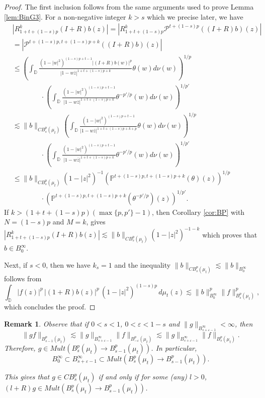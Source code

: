\documentclass[12pt,twoside,leqno,final]{amsart}
\theoremstyle{plain}
\newtheorem{rem}[thm]{Remark}
\begin{document}
\begin{proof}
The first inclusion  follows from the same arguments used to prove Lemma \ref{lem:BinG3}. 
For a non-negative integer $k>s$ which we precise later, we have 
\begin{align*}
&|R_{1+t+(1-s)p}^{k}(I+R) b(z)|=|R_{1+t+(1-s)p}^{k}{{\mathcal P}}^{t+(1-s)p}((I+R)b)(z)|\\
&=|{{\mathcal P}}^{t+(1-s)p,t+(1-s)p+k}((I+R) b)(z)|\\
&\le \left(\int_{{\mathbb D}} \frac{(1-|w|^2)^{(1-s)p+t-1}|(I+R)b(w)|^p}
{|1-w\overline z|^{1+t+(1-s)p+k}}\theta(w)d\nu(w)\right)^{1/p}\,\\
&\qquad\qquad \cdot\left( \int_{{\mathbb D}}\frac{(1-|w|^2)^{(1-s)p+t-1}}{|1-w\overline z|^{1+t+(1-s)p+k}}\theta^{-p'/p}(w)d\nu(w)\right)^{1/p'}\\
&\lesssim \|b\|_{CB^p_s(\mu_t)}\left(\int_{{\mathbb D}} \frac{(1-|w|^2)^{(1-s)p+t-1}}
{|1-w\overline z|^{1+t+(1-s)p+k+p}}\theta(w)d\nu(w)\right)^{1/p}\,\\
&\qquad\qquad \cdot\left( \int_{{\mathbb D}}\frac{(1-|w|^2)^{(1-s)p+t-1}}{|1-w\overline z|^{1+t+(1-s)p+k}}\theta^{-p'/p}(w)d\nu(w)\right)^{1/p'}\\
&\le \|b\|_{CB^p_s(\mu_t)}
(1-|z|^2)^{-1}\left({\mathbb{P}}^{t+(1-s)p,t+(1-s)p+k}(\theta)(z)\right)^{1/p}\,\\
&\qquad\qquad\cdot\left({\mathbb{P}}^{t+(1-s)p,t+(1-s)p+k}(\theta^{-p'/p})(z)\right)^{1/p'}.
\end{align*}
If $k>(1+t+(1-s)p)(\max\{p,p'\}-1)$, then Corollary \ref{cor:BP}  with $N=(1-s)p$ and $M=k$, gives 
$
|R_{1+t+(1-s)p}^{k}(I+R) b(z)|\lesssim \|b\|_{CB^p_s(\mu_t)}(1-|z|^2)^{-1-k} 
$
 which proves that $b\in B^\infty_0$.

Next, if $s<0$, then we have $k_s=1$ and the inequality $  \|b\|_{CB^p_s(\mu_t)}\lesssim \|b\|_{B^\infty_0}$
follows from 
$$
\int_{{\mathbb D}} |f(z)|^p\,|(1+R) b(z)|^p\,(1-|z|^2)^{(1-s)p}\,d\mu_t(z)\lesssim \|b\|_{B^\infty_0}^p\|f\|_{B^p_s(\mu_t)}^p,
$$
which concludes the proof.
\end{proof}

\begin{rem}\label{rem:CBindepk}
Observe that if $0<s<1$, $0<{\varepsilon}<1-s$ and $\|g\|_{B^\infty_{s+{\varepsilon}-1}}<\infty$, then 
$$
\|g f\|_{B^p_{s-1}(\mu_t)}\lesssim \|g\|_{B^\infty_{s+{\varepsilon}-1}} \|f\|_{B^{p}_{-{\varepsilon}}(\mu_t)}\lesssim \|g\|_{B^\infty_{s+{\varepsilon}-1}} \|f\|_{B^{p}_{s}(\mu_t)}.
$$
Therefore, $g\in Mult(B^{p}_{s}(\mu_t)\to B^{p}_{s-1}(\mu_t))$. 
In particular, 
$$
B^\infty_0\subset B^\infty_{s+{\varepsilon}-1}\subset Mult(B^{p}_{s}(\mu_t)\to B^{p}_{s-1}(\mu_t)).
$$

This gives  that 
$g\in CB^{p}_{s}(\mu_t)$ if and only if for some (any) $l>0$, $(l+R)g\in Mult(B^{p}_{s}(\mu_t)\to B^{p}_{s-1}(\mu_t))$. 
\end{rem}
\end{document}

